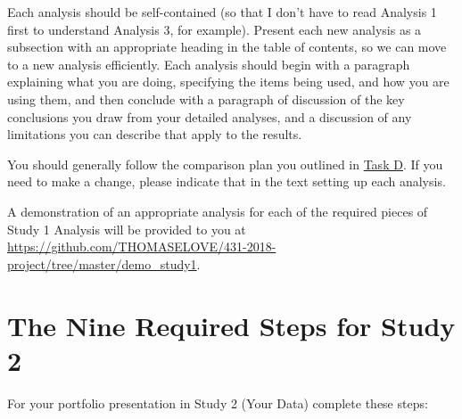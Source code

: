 \documentclass[]{book}
\theoremstyle{definition}
\theoremstyle{definition}
\theoremstyle{definition}
\theoremstyle{remark}
\begin{document}
Each analysis should be self-contained (so that I don't have to read
Analysis 1 first to understand Analysis 3, for example). Present each
new analysis as a subsection with an appropriate heading in the table of
contents, so we can move to a new analysis efficiently. Each analysis
should begin with a paragraph explaining what you are doing, specifying
the items being used, and how you are using them, and then conclude with
a paragraph of discussion of the key conclusions you draw from your
detailed analyses, and a discussion of any limitations you can describe
that apply to the results.

You should generally follow the comparison plan you outlined in
\protect\hyperlink{taskD}{Task D}. If you need to make a change, please
indicate that in the text setting up each analysis.

A demonstration of an appropriate analysis for each of the required
pieces of Study 1 Analysis will be provided to you at
\url{https://github.com/THOMASELOVE/431-2018-project/tree/master/demo_study1}.

\hypertarget{the-nine-required-steps-for-study-2}{%
\section{The Nine Required Steps for Study
2}\label{the-nine-required-steps-for-study-2}}

For your portfolio presentation in Study 2 (Your Data) complete these
steps:
\end{document}
